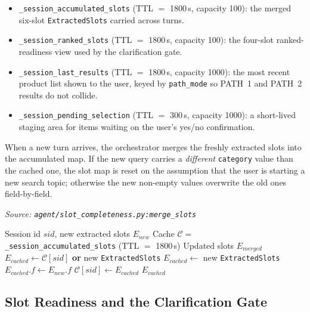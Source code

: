 \begin{itemize}
\item \texttt{\_session\_accumulated\_slots} (TTL $=$ 1800\,s, capacity 100): the merged six-slot \texttt{ExtractedSlots} carried across turns.
\item \texttt{\_session\_ranked\_slots} (TTL $=$ 1800\,s, capacity 100): the four-slot ranked-readiness view used by the clarification gate.
\item \texttt{\_session\_last\_results} (TTL $=$ 1800\,s, capacity 1000): the most recent product list shown to the user, keyed by \texttt{path\_mode} so PATH~1 and PATH~2 results do not collide.
\item \texttt{\_session\_pending\_selection} (TTL $=$ 300\,s, capacity 1000): a short-lived staging area for items waiting on the user's yes/no confirmation.
\end{itemize}

When a new turn arrives, the orchestrator merges the freshly extracted slots into the accumulated map. If the new query carries a \emph{different} \texttt{category} value than the cached one, the slot map is reset on the assumption that the user is starting a new search topic; otherwise the new non-empty values overwrite the old ones field-by-field.

\begin{algorithm}[H]
\caption{Short-Term Memory Management via TTLCache}\label{alg:ttlcache_memory}
\textit{Source: \texttt{agent/slot\_completeness.py:merge\_slots}}
\begin{algorithmic}[1]
\Require Session id $sid$, new extracted slots $E_{new}$
\Require Cache $\mathcal{C}=$ \texttt{\_session\_accumulated\_slots} (TTL $=$ 1800\,s)
\Ensure Updated slots $E_{merged}$
    \State $E_{cached} \gets \mathcal{C}[sid]$ \textbf{or} new \texttt{ExtractedSlots}
        \State $E_{cached} \gets$ new \texttt{ExtractedSlots} 
    \EndIf
            \State $E_{cached}.f \gets E_{new}.f$
        \EndIf
    \EndFor
    \State $\mathcal{C}[sid] \gets E_{cached}$
    \State \Return $E_{cached}$
\EndFunction
\end{algorithmic}
\end{algorithm}

\subsection{Slot Readiness and the Clarification Gate}
\label{subsec:slot_readiness}

